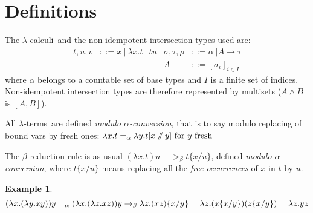 \documentclass{article}
\newtheorem{Def}{Definition}
\newtheorem*{Ex*}{Example}
\def\lci{$\lambda$-calculi}
\def\lterms{$\lambda$-terms}
\def\aconv{$\alpha$-conversion}
\newcommand{\sslash}{\mathbin{/\mkern-6mu/}}
\begin{document}

\section {Definitions}
The \lci\ and the non-idempotent intersection types used are:
\begin{align*}
	t, u, v &::= x\ |\ \lambda x.t\ |\ tu 
	& \sigma, \tau, \rho &::= \alpha \ | A \rightarrow \tau \\
	&& A &::= [\sigma_i]_{i \in I}
\end{align*}
where $\alpha$ belongs to a countable set of base types and $I$ is a finite set of indices. Non-idempotent intersection types are therefore represented by multisets ($A\wedge B$ is $[A,B]$).

All \lterms\ are defined \emph{modulo \aconv}, that is to say modulo replacing of bound vars by fresh ones: $\lambda x.t =_\alpha \lambda y.t[x\sslash y] \text{ for $y$ fresh}$

The $\beta$-reduction rule is as usual $(\lambda x.t) u ->_\beta t\{x/u\}$, defined \emph{modulo \aconv}, where $t\{x/u\}$ means replacing all the \emph{free occurrences} of $x$ in $t$ by $u$.

\begin{Ex*}
    \begin{displaymath}
        (\lambda x.(\lambda y. xy)) y 
        =_\alpha (\lambda x.(\lambda z. xz)) y
        \\->_\beta \lambda z.(xz)\{x/y\}
        =\lambda z.(x\{x/y\})(z\{x/y\})
        = \lambda z.yz
    \end{displaymath}
\end{Ex*}
\end{document}

